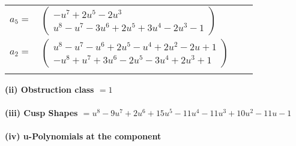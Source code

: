 \documentclass[1p]{elsarticle_modified}
\theoremstyle{definition}
\begin{document}
\begin{tabular}{m{7pt} m{180pt} m{7pt} m{180pt} }
\flushright $a_{5}=$&$\begin{pmatrix}- u^7+2 u^5-2 u^3\\u^8- u^7-3 u^6+2 u^5+3 u^4-2 u^3-1\end{pmatrix}$ \\
\flushright $a_{2}=$&$\begin{pmatrix}u^8- u^7- u^6+2 u^5- u^4+2 u^2-2 u+1\\- u^8+u^7+3 u^6-2 u^5-3 u^4+2 u^3+1\end{pmatrix}$\\&\end{tabular}
\flushleft \textbf{(ii) Obstruction class $= 1$}\\~\\
\flushleft \textbf{(iii) Cusp Shapes $= u^8-9 u^7+2 u^6+15 u^5-11 u^4-11 u^3+10 u^2-11 u-1$}\\~\\
\newpage\renewcommand{\arraystretch}{1}
\flushleft \textbf{(iv) u-Polynomials at the component}\newline \\
\end{document}

